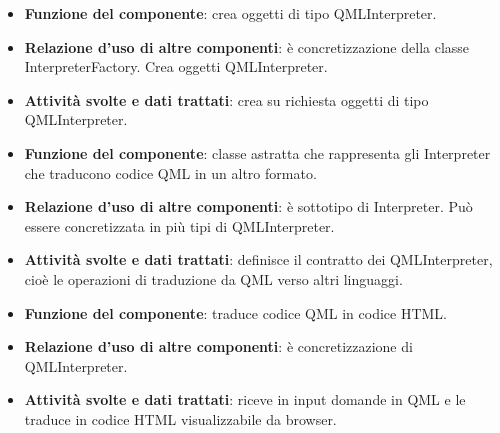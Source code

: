\begin{itemize}
	\item\textbf{Funzione del componente}: crea oggetti di tipo QMLInterpreter.
	\item\textbf{Relazione d'uso di altre componenti}: è concretizzazione della classe InterpreterFactory. Crea oggetti QMLInterpreter.
	\item\textbf{Attività svolte e dati trattati}: crea su richiesta oggetti di tipo QMLInterpreter.
\end{itemize}
\begin{itemize}
	\item\textbf{Funzione del componente}: classe astratta che rappresenta gli Interpreter che traducono codice QML in un altro formato.
	\item\textbf{Relazione d'uso di altre componenti}: è sottotipo di Interpreter. Può essere concretizzata in più tipi di QMLInterpreter.
	\item\textbf{Attività svolte e dati trattati}: definisce il contratto dei QMLInterpreter, cioè le operazioni di traduzione da QML verso altri linguaggi.
\end{itemize}
\begin{itemize}
	\item\textbf{Funzione del componente}: traduce codice QML in codice HTML.
	\item\textbf{Relazione d'uso di altre componenti}: è concretizzazione di QMLInterpreter.
	\item\textbf{Attività svolte e dati trattati}: riceve in input domande in QML e le traduce in codice HTML visualizzabile da browser.
\end{itemize}

